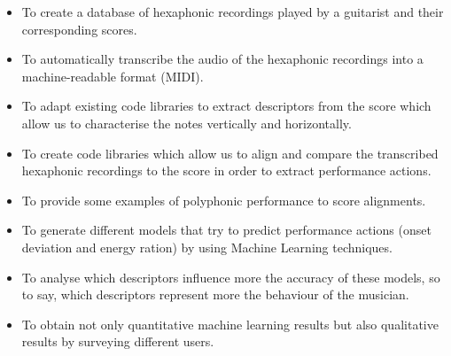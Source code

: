 \begin{itemize}[noitemsep]
\item To create a database of hexaphonic recordings played by a guitarist and their corresponding scores.
\item To automatically transcribe the audio of the hexaphonic recordings into a machine-readable format (MIDI).
\item To adapt existing code libraries to extract descriptors from the score which allow us to characterise the notes vertically and horizontally.
\item To create code libraries which allow us to align and compare the transcribed hexaphonic recordings to the score in order to extract performance actions.
\item To provide some examples of polyphonic performance to score alignments.
\item To generate different models that try to predict performance actions (onset deviation and energy ration) by using Machine Learning techniques.
\item To analyse which descriptors influence more the accuracy of these models, so to say, which descriptors represent more the behaviour of the musician.
\item To obtain not only quantitative machine learning results but also qualitative results by surveying different users.
\end{itemize}

\cleardoublepage

